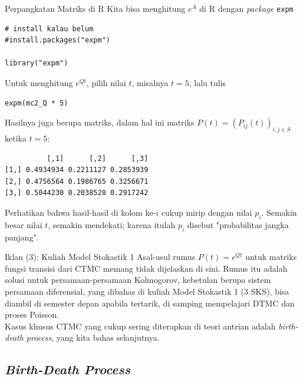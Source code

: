 \documentclass{beamer}
\newcommand{\pars}[1]{\left(#1\right)}
\begin{document}
\begin{frame}[fragile]{Perpangkatan Matriks di R}
    Kita bisa menghitung \(e^A\) di R dengan \textit{package} \verb|expm|
\begin{verbatim}
# install kalau belum
#install.packages("expm")

library("expm")
\end{verbatim}
    Untuk menghitung \(e^{Qt}\), pilih nilai \(t\), misalnya \(t = 5\), lalu tulis
\begin{verbatim}
expm(mc2_Q * 5)
\end{verbatim}
    Hasilnya juga berupa matriks, dalam hal ini matriks \(P(t) = \pars{P_{ij}(t)}_{i,j\in S}\) ketika \(t=5\):
\begin{verbatim}
          [,1]      [,2]      [,3]
[1,] 0.4934934 0.2211127 0.2853939
[2,] 0.4756564 0.1986765 0.3256671
[3,] 0.5044230 0.2038528 0.2917242
\end{verbatim}
    Perhatikan bahwa hasil-hasil di kolom ke-\(i\) cukup mirip dengan nilai \(p_i\). Semakin besar nilai \(t\), semakin mendekati; karena itulah \(p_i\) disebut "probabilitas jangka panjang".
\end{frame}

\begin{frame}{Iklan (3): Kuliah Model Stokastik 1}
    Asal-usul rumus \(P(t) = e^{Qt}\) untuk matriks fungsi transisi dari CTMC memang tidak dijelaskan di sini. Rumus itu adalah solusi untuk persamaan-persamaan Kolmogorov, kebetulan berupa sistem persamaan diferensial, yang dibahas di kuliah Model Stokastik 1 (3 SKS), bisa diambil di semester depan apabila tertarik, di samping mempelajari DTMC dan proses Poisson. \\[0.5em]
    
    Kasus khusus CTMC yang cukup sering diterapkan di teori antrian adalah \textit{birth-death process}, yang kita bahas selanjutnya.
\end{frame}

\subsection{\textit{Birth-Death Process}}
\end{document}
